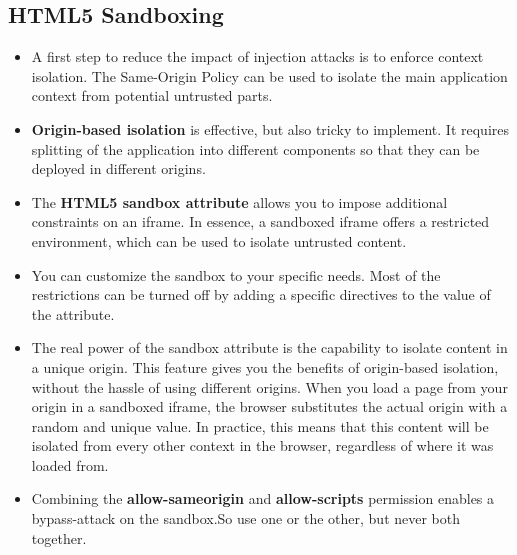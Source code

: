 \documentclass[../main.tex]{subfiles}
\begin{document}
\subsection{HTML5 Sandboxing}
\begin{itemize}
\item A first step to reduce the impact of injection attacks is to enforce context isolation. The Same-Origin Policy can be used to isolate the main application context from potential untrusted parts.
\item \textbf{Origin-based isolation} is effective, but also tricky to implement. It requires splitting of the application into different components so that they can be deployed in different origins.
\item The \textbf{HTML5 sandbox attribute} allows you to impose additional constraints on an iframe. In essence, a sandboxed iframe offers a restricted environment, which can be used to isolate untrusted content.
\item You can customize the sandbox to your specific needs. Most of the restrictions can be turned off by adding a specific directives to the value of the attribute.
\item The real power of the sandbox attribute is the capability to isolate content in a unique origin. This feature gives you the benefits of origin-based isolation, without the hassle of using different origins. When you load a page from your origin in a sandboxed iframe, the browser substitutes the actual origin with a random and unique value. In practice, this means that this content will be isolated from every other context in the browser, regardless of where it was loaded from.
\item Combining the \textbf{allow-sameorigin} and \textbf{allow-scripts} permission enables a bypass-attack on the sandbox.So use one or the other, but never both together.
\end{itemize}
\end{document}
